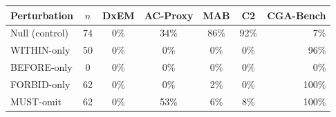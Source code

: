 \begin{tabular}{lcccccr}
\toprule
Perturbation & $n$ & DxEM & AC-Proxy & MAB & C2 & CGA-Bench \\
\midrule
  Null (control) & 74 & 0\% & 34\% & 86\% & 92\% & 7\% \\
  WITHIN-only & 50 & 0\% & 0\% & 0\% & 0\% & 96\% \\
  BEFORE-only & 0 & 0\% & 0\% & 0\% & 0\% & 0\% \\
  FORBID-only & 62 & 0\% & 0\% & 2\% & 0\% & 100\% \\
  MUST-omit & 62 & 0\% & 53\% & 6\% & 8\% & 100\% \\
\bottomrule
\end{tabular}